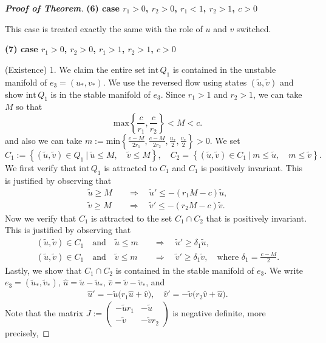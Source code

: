 \documentclass{amsart}
\theoremstyle{definition}
\numberwithin{equation}{section}
\def\ii{{\textrm{int}}\,}
\begin{document}
\begin{proof}[\textbf{Proof of Theorem}]
\bigskip

\textbf{(6) \boldmath case $r_1>0$, $r_2>0$, $r_1 <1$, $r_2>1$, $c>0$}

This case is treated exactly the same with the role of $u$ and $v$ switched.
\bigskip

\textbf{(7) \boldmath case  $r_1>0$, $r_2>0$, $r_1>1$, $r_2>1$, $c>0$}

\bigskip
(Existence) 1. We claim the entire set $\ii Q_1$ is contained in the unstable manifold of $e_3=(u_*,v_*)$. We use the reversed flow using states $(\tilde u, \tilde v)$  and show $\ii Q_1$ is in the stable manifold of $e_3$. Since $r_1>1$ and $r_2>1$, we can take $M$ so that
$$ \textrm{max}\left\{ \frac{c}{r_1}, \frac{c}{r_2}\right\} < M < c.$$
and also we can take $m:=\textrm{min}\left\{ \frac{c-M}{2r_1}, \frac{c-M}{2r_2}, \frac{u_*}{2}, \frac{v_*}{2} \right\}>0$.
We set $$C_1:= \left\{(\tilde u,\tilde v) \in Q_1~|~ \tilde u \le M, \quad \tilde v \le M\right\}, \quad C_2= \left\{(\tilde u,\tilde v) \in C_1 ~|~ m \le \tilde u, \quad m\le \tilde v \right\}.$$
We first verify that $\ii Q_1$ is attracted to $C_1$ and $C_1$ is positively invariant. This is justified by observing that
\begin{align*}
 \tilde u \ge M  \quad &\Longrightarrow \quad \tilde u' \le -(r_1M-c) \tilde u, \\
 \tilde v \ge M  \quad &\Longrightarrow \quad \tilde v' \le -(r_2M-c) \tilde v.
\end{align*}
Now we verify that $C_1$ is attracted to the set $C_1 \cap C_2$ that is positively invariant. This is justified by observing that
\begin{align*}
 (\tilde u,\tilde v)\in C_1 \quad \text{and} \quad \tilde u \le m \quad &\Longrightarrow \quad \tilde u' \ge \delta_1 \tilde u, \\
 (\tilde u,\tilde v)\in C_1 \quad \text{and} \quad \tilde v \le m \quad &\Longrightarrow \quad \tilde v'\ge \delta_1 \tilde v, \quad \text{where $\delta_1 = \frac{c-M}{2}$}.
\end{align*}
Lastly, we show that $C_1\cap C_2$ is contained in the stable manifold of $e_3$. We write $e_3 = (\tilde u_*, \tilde v_*)$, $\hat u = \tilde u - \tilde u_*$, $\hat v = \tilde v - \tilde v_*$, and 
\begin{align*}
 \hat u' = -\tilde u \big(r_1 \hat u + \hat v\big), \quad 
 \hat v' = -\tilde v \big(r_2 \hat v + \hat u\big).
\end{align*}
Note that the matrix $J:=\begin{pmatrix} -\tilde ur_1 & -\tilde u \\ -\tilde v & -\tilde vr_2 \end{pmatrix}$ is negative definite, more precisely,

\end{proof}
\end{document}
